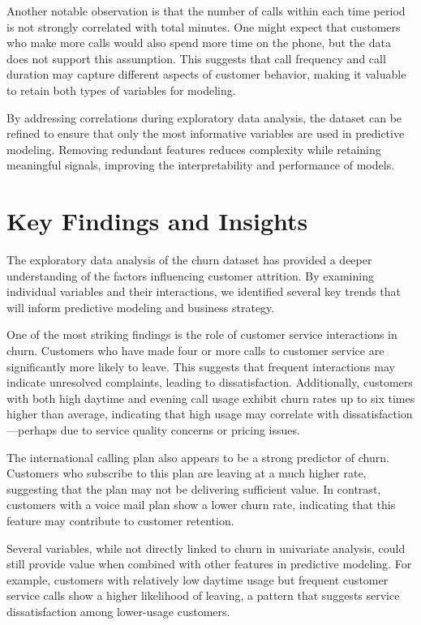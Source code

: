 \documentclass[
  11pt,
]{book}
\theoremstyle{definition}
\theoremstyle{definition}
\theoremstyle{definition}
\theoremstyle{definition}
\theoremstyle{remark}
\begin{document}
Another notable observation is that the number of calls within each time period is not strongly correlated with total minutes. One might expect that customers who make more calls would also spend more time on the phone, but the data does not support this assumption. This suggests that call frequency and call duration may capture different aspects of customer behavior, making it valuable to retain both types of variables for modeling.

By addressing correlations during exploratory data analysis, the dataset can be refined to ensure that only the most informative variables are used in predictive modeling. Removing redundant features reduces complexity while retaining meaningful signals, improving the interpretability and performance of models.

\section{Key Findings and Insights}\label{key-findings-and-insights}

The exploratory data analysis of the churn dataset has provided a deeper understanding of the factors influencing customer attrition. By examining individual variables and their interactions, we identified several key trends that will inform predictive modeling and business strategy.

One of the most striking findings is the role of customer service interactions in churn. Customers who have made four or more calls to customer service are significantly more likely to leave. This suggests that frequent interactions may indicate unresolved complaints, leading to dissatisfaction. Additionally, customers with both high daytime and evening call usage exhibit churn rates up to six times higher than average, indicating that high usage may correlate with dissatisfaction---perhaps due to service quality concerns or pricing issues.

The international calling plan also appears to be a strong predictor of churn. Customers who subscribe to this plan are leaving at a much higher rate, suggesting that the plan may not be delivering sufficient value. In contrast, customers with a voice mail plan show a lower churn rate, indicating that this feature may contribute to customer retention.

Several variables, while not directly linked to churn in univariate analysis, could still provide value when combined with other features in predictive modeling. For example, customers with relatively low daytime usage but frequent customer service calls show a higher likelihood of leaving, a pattern that suggests service dissatisfaction among lower-usage customers.
\end{document}
